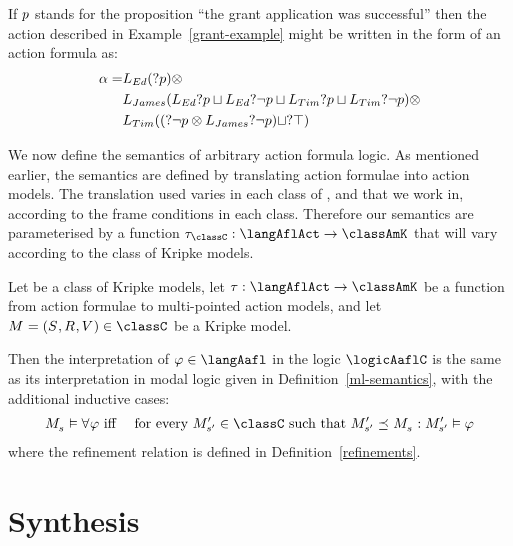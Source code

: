 \begin{example}\label{grant-example-formula}
If $\atomP$ stands for the proposition ``the grant application was successful'' then the action described in Example~\ref{grant-example} might be written in the form of an action formula as:
\begin{align*}
    \alpha = &\learns[Ed] (\test{\atomP}) \compose\\
    &\learns[James] (\learns[Ed] \test{\atomP} \choice \learns[Ed] \test{\neg \atomP} \choice \learns[Tim] \test{\atomP} \choice \learns[Tim] \test{\neg \atomP}) \compose\\
    &\learns[Tim] ((\test{\neg \atomP} \compose \learns[James] \test{\neg \atomP}) \choice \test{\top})
\end{align*}
\end{example}

We now define the semantics of arbitrary action formula logic.
As mentioned earlier, the semantics are defined by translating action formulae into action models.
The translation used varies in each class of \classK{}, \classKFF{} and \classS{} that we work in, according to the frame conditions in each class.
Therefore our semantics are parameterised by a function $\tau_\classC: \langAflAct \to \classAmK$ that will vary according to the class of Kripke models.

\begin{definition}
Let \classC{} be a class of Kripke models, let $\tau : \langAflAct \to \classAmK$ be a function from action formulae to multi-pointed action models, and let $\kModel = \kModelTuple \in \classC$ be a Kripke model.

Then the interpretation of $\phi \in \langAafl$ in the logic $\logicAaflC$ is the same as its interpretation in modal logic given in Definition~\ref{ml-semantics}, with the additional inductive cases:
\begin{eqnarray*}
    \kPModel{\kStateS} \entails \allrefs \phi &\text{ iff }& \text{for every } \kPModelP{\kStateSP} \in \classC \text{ such that } \kPModelP{\kStateSP} \refines \kPModel{\kStateS}: \kPModelP{\kStateSP} \entails \phi
\end{eqnarray*}
where the refinement relation is defined in Definition~\ref{refinements}.
\end{definition}

\section{Synthesis}\label{synthesis}

